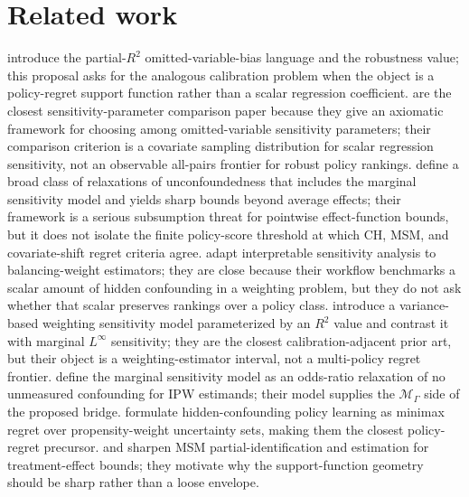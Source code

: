 \documentclass[11pt]{article}
\theoremstyle{definition}
\theoremstyle{plain}
\theoremstyle{remark}
\begin{document}
\section{Related work}
\citet{CinelliHazlett2020} introduce the partial-$R^2$ omitted-variable-bias language and the robustness value; this proposal asks for the analogous calibration problem when the object is a policy-regret support function rather than a scalar regression coefficient.  \citet{DiegertMastenPoirier2025} are the closest sensitivity-parameter comparison paper because they give an axiomatic framework for choosing among omitted-variable sensitivity parameters; their comparison criterion is a covariate sampling distribution for scalar regression sensitivity, not an observable all-pairs frontier for robust policy rankings.  \citet{MastenPoirierRen2025} define a broad class of relaxations of unconfoundedness that includes the marginal sensitivity model and yields sharp bounds beyond average effects; their framework is a serious subsumption threat for pointwise effect-function bounds, but it does not isolate the finite policy-score threshold at which CH, MSM, and covariate-shift regret criteria agree.  \citet{SorianoBenMichaelBickelFellerPimentel2023} adapt interpretable sensitivity analysis to balancing-weight estimators; they are close because their workflow benchmarks a scalar amount of hidden confounding in a weighting problem, but they do not ask whether that scalar preserves rankings over a policy class.  \citet{HuangPimentel2025} introduce a variance-based weighting sensitivity model parameterized by an $R^2$ value and contrast it with marginal $L^\infty$ sensitivity; they are the closest calibration-adjacent prior art, but their object is a weighting-estimator interval, not a multi-policy regret frontier.  \citet{ZhaoSmallBhattacharya2019} define the marginal sensitivity model as an odds-ratio relaxation of no unmeasured confounding for IPW estimands; their model supplies the $\mathcal M_{\Gamma}$ side of the proposed bridge.  \citet{KallusZhou2021} formulate hidden-confounding policy learning as minimax regret over propensity-weight uncertainty sets, making them the closest policy-regret precursor.  \citet{YadlowskyNamkoongBasuDuchiTian2022} and \citet{DornGuoKallus2025} sharpen MSM partial-identification and estimation for treatment-effect bounds; they motivate why the support-function geometry should be sharp rather than a loose envelope.
\end{document}
